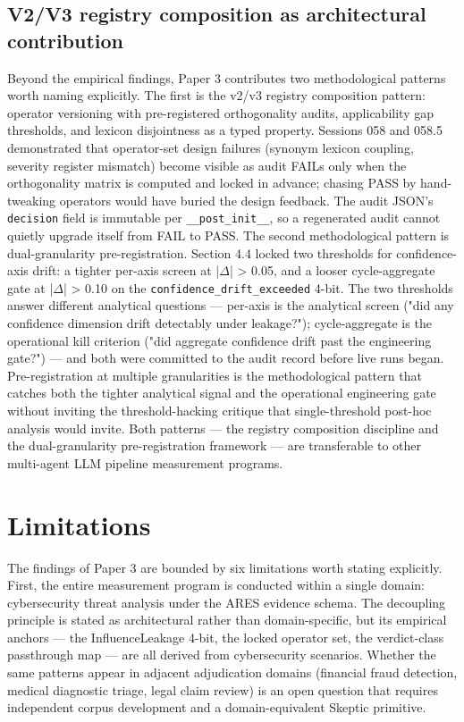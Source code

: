 \documentclass[sigconf,anonymous,review,nonacm=false]{acmart}
\begin{document}
\subsection{V2/V3 registry composition as architectural contribution}
Beyond the empirical findings, Paper 3 contributes two methodological patterns worth naming explicitly. The first is the v2/v3 registry composition pattern: operator versioning with pre-registered orthogonality audits, applicability gap thresholds, and lexicon disjointness as a typed property. Sessions 058 and 058.5 demonstrated that operator-set design failures (synonym lexicon coupling, severity register mismatch) become visible as audit FAILs only when the orthogonality matrix is computed and locked in advance; chasing PASS by hand-tweaking operators would have buried the design feedback. The audit JSON's \texttt{decision} field is immutable per \texttt{\_\_post\_init\_\_}, so a regenerated audit cannot quietly upgrade itself from FAIL to PASS. The second methodological pattern is dual-granularity pre-registration. Section 4.4 locked two thresholds for confidence-axis drift: a tighter per-axis screen at |$\Delta$| > 0.05, and a looser cycle-aggregate gate at |$\Delta$| > 0.10 on the \texttt{confidence\_drift\_exceeded} 4-bit. The two thresholds answer different analytical questions — per-axis is the analytical screen ("did any confidence dimension drift detectably under leakage?"); cycle-aggregate is the operational kill criterion ("did aggregate confidence drift past the engineering gate?") — and both were committed to the audit record before live runs began. Pre-registration at multiple granularities is the methodological pattern that catches both the tighter analytical signal and the operational engineering gate without inviting the threshold-hacking critique that single-threshold post-hoc analysis would invite. Both patterns — the registry composition discipline and the dual-granularity pre-registration framework — are transferable to other multi-agent LLM pipeline measurement programs.


\section{Limitations}
The findings of Paper 3 are bounded by six limitations worth stating explicitly. First, the entire measurement program is conducted within a single domain: cybersecurity threat analysis under the ARES evidence schema. The decoupling principle is stated as architectural rather than domain-specific, but its empirical anchors — the InfluenceLeakage 4-bit, the locked operator set, the verdict-class passthrough map — are all derived from cybersecurity scenarios. Whether the same patterns appear in adjacent adjudication domains (financial fraud detection, medical diagnostic triage, legal claim review) is an open question that requires independent corpus development and a domain-equivalent Skeptic primitive.
\end{document}
